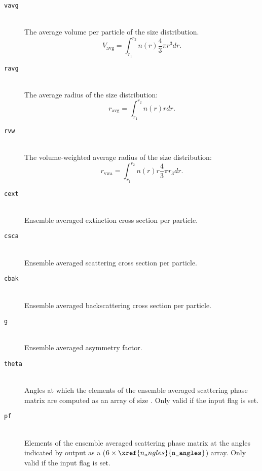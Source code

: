 \begin{description}
\item[\texttt{vavg}] \hfill \\
The average volume per particle of the size distribution.
\begin{equation}
V_{\mathrm{avg}} = \int^{r_2}_{r_{1}} n(r) \frac{4}{3} \pi r^{3} dr.
\label{eq:lmie_outputs_vavg}
\end{equation}

\item[\texttt{ravg}] \hfill \\
The average radius of the size distribution:
\begin{equation}
r_{\mathrm{avg}} = \int^{r_2}_{r_{1}} n(r) r dr.
\label{eq:lmie_outputs_ravg}
\end{equation}

\item[\texttt{rvw}] \hfill \\
The volume-weighted average radius of the size distribution:
\begin{equation}
r_{\mathrm{vwa}} = \int^{r_2}_{r_{1}} n(r) r \frac{4}{3} \pi r_{3} dr.
\label{eq:lmie_outputs_rvw}
\end{equation}

\item[\texttt{cext}] \hfill \\
Ensemble averaged extinction cross section per particle.

\item[\texttt{csca}] \hfill \\
Ensemble averaged scattering cross section per particle.

\item[\texttt{cbak}] \hfill \\
Ensemble averaged backscattering cross section per particle.

\item[\texttt{g}] \hfill \\
Ensemble averaged asymmetry factor.

\item[\texttt{theta}] \hfill \\
Angles at which the elements of the ensemble averaged scattering phase matrix are computed as an array of size .  Only valid if the input flag  is set.

\item[\texttt{pf}] \hfill \\
Elements of the ensemble averaged scattering phase matrix at the angles indicated by output  as a ($6 \times \xref{n_angles}{\texttt{n\_angles}}$) array.  Only valid if the input flag  is set.


\end{description}
